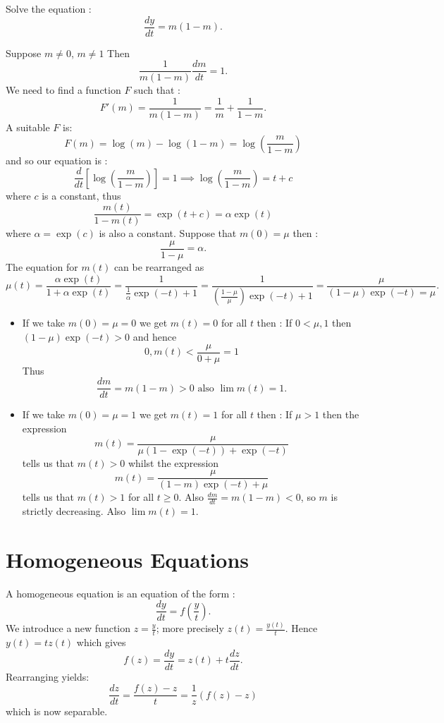 \bigskip 

\begin{example}  Solve the equation : $$\frac{dy}{dt} = m(1 - m).$$
\begin{solution} Suppose $ m \neq 0$, $ m \neq 1$ Then $$\frac{1}{m(1-m)}\frac{dm}{dt} = 1.$$
We need to find a function $F$ such that :
$$F'(m) = \frac{1}{m(1-m)} = \frac{1}{m} + \frac{1}{1-m}.$$
A suitable $F$ is: $$F(m) = \log(m) - \log(1-m) = \log(\frac{m}{1-m})$$ and so our equation is : $$\frac{d}{dt}[\log(\frac{m}{1-m})] = 1 \implies \log(\frac{m}{1-m}) = t + c$$ where $c$ is a constant, thus $$\frac{m(t)}{1-m(t)} = \exp(t + c) = \alpha \exp(t)$$ where $\alpha = \exp(c)$ is also a constant. Suppose that $m(0) = \mu$ then : $$\frac{\mu}{1-\mu} = \alpha.$$
The equation for $m(t)$ can be rearranged as $$\mu(t) = \frac{\alpha \exp(t)}{1 + \alpha \exp(t)} = \frac{1}{\frac{1}{\alpha} \exp(-t) + 1} = \frac{1}{(\frac{1 - \mu}{\mu}) \exp(-t) + 1} = \frac{\mu}{(1-\mu) \exp(-t) = \mu}.$$
\end{solution}
\end{example}

\bigskip 

\begin{remark}
\begin{itemize}
\item If we take $m(0) = \mu = 0$ we get $m(t) = 0$ for all $t$ then : \newline
If $0 < \mu , 1$ then $(1 - \mu)\exp(-t) > 0$ and hence $$ 0 , m(t) < \frac{\mu}{0 + \mu} = 1$$ Thus $$\frac{dm}{dt} = m(1-m) > 0 \mbox{ also } \lim m(t) = 1.$$

\item If we take $m(0) = \mu = 1$ we get $m(t) = 1$ for all $t$ then :
\newline
If $\mu > 1$ then the expression $$m(t) = \frac{\mu}{\mu(1-\exp(-t))+ \exp(-t)}$$ tells us that $m(t) > 0$ whilst the expression $$m(t) = \frac{\mu}{(1-m)\exp(-t) + \mu}$$ tells us that $m(t) > 1$ for all $t \geq 0$. Also $\frac{dm}{dt} = m(1-m) < 0$, so $m$ is strictly decreasing. Also $\lim m(t) = 1$.

\end{itemize}
\end{remark}
\section{Homogeneous Equations }

A homogeneous equation is an equation of the form : $$\frac{dy}{dt} = f(\frac{y}{t}).$$
We introduce a new function $z = \frac{y}{t}$; more precisely $z(t) = \frac{y(t)}{t}$. Hence $y(t) = tz(t)$ which gives $$f(z) = \frac{dy}{dt} = z(t) + t\frac{dz}{dt}.$$
Rearranging yields: $$\frac{dz}{dt} = \frac{f(z) - z}{t} = \frac{1}{z}(f(z) - z)$$ which is now separable.

